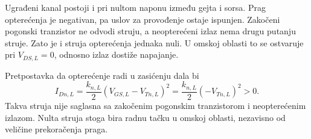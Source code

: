 Ugrađeni kanal postoji i pri nultom naponu između gejta i sorsa. Prag opterećenja je negativan, pa uslov za provođenje ostaje ispunjen. Zakočeni pogonski tranzistor ne odvodi struju, a neopterećeni izlaz nema drugu putanju struje. Zato je i struja opterećenja jednaka nuli. U omskoj oblasti to se ostvaruje pri $V_{DS,L}=0$, odnosno izlaz dostiže napajanje.

Pretpostavka da opterećenje radi u zasićenju dala bi
\[I_{Dn,L}=\frac{k_{n,L}}2(V_{GS,L}-V_{Tn,L})^2=\frac{k_{n,L}}2(-V_{Tn,L})^2>0.\]
Takva struja nije saglasna sa zakočenim pogonskim tranzistorom i neopterećenim izlazom. Nulta struja stoga bira radnu tačku u omskoj oblasti, nezavisno od veličine prekoračenja praga.
